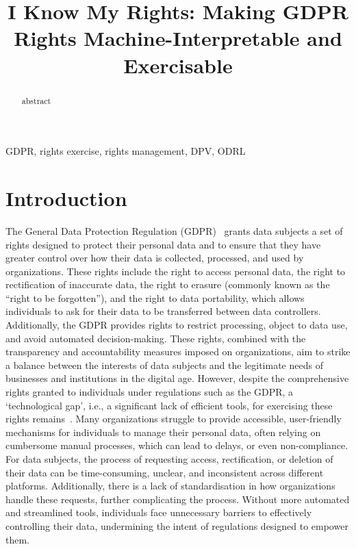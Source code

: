 \documentclass{IOS-Book-Article}     %
\begin{document}
\begin{frontmatter}          %
%
\title{I Know My Rights: Making GDPR Rights Machine-Interpretable and Exercisable}
\runningtitle{}

\author{ }
\address{IDLab, UGent -- imec}
\runningauthor{}
%
%
\begin{abstract}
abstract
\end{abstract}

\begin{keyword}
GDPR, rights exercise, rights management, DPV, ODRL
\end{keyword}

\end{frontmatter}

\section{Introduction}
\label{sec:intro}

The General Data Protection Regulation (GDPR)~\cite{gdpr} grants data subjects a set of rights designed to protect their personal data and to ensure that they have greater control over how their data is collected, processed, and used by organizations.
These rights include the right to access personal data, the right to rectification of inaccurate data, the right to erasure (commonly known as the ``right to be forgotten''), and the right to data portability, which allows individuals to ask for their data to be transferred between data controllers.
Additionally, the GDPR provides rights to restrict processing, object to data use, and avoid automated decision-making.
These rights, combined with the transparency and accountability measures imposed on organizations, aim to strike a balance between the interests of data subjects and the legitimate needs of businesses and institutions in the digital age.
However, despite the comprehensive rights granted to individuals under regulations such as the GDPR, a `technological gap', i.e., a significant lack of efficient tools, for exercising these rights remains~\cite{bernes_enhancing_2022}.
Many organizations struggle to provide accessible, user-friendly mechanisms for individuals to manage their personal data, often relying on cumbersome manual processes, which can lead to delays, or even non-compliance.
For data subjects, the process of requesting access, rectification, or deletion of their data can be time-consuming, unclear, and inconsistent across different platforms.
Additionally, there is a lack of standardisation in how organizations handle these requests, further complicating the process.
Without more automated and streamlined tools, individuals face unnecessary barriers to effectively controlling their data, undermining the intent of regulations designed to empower them.
\end{document}

